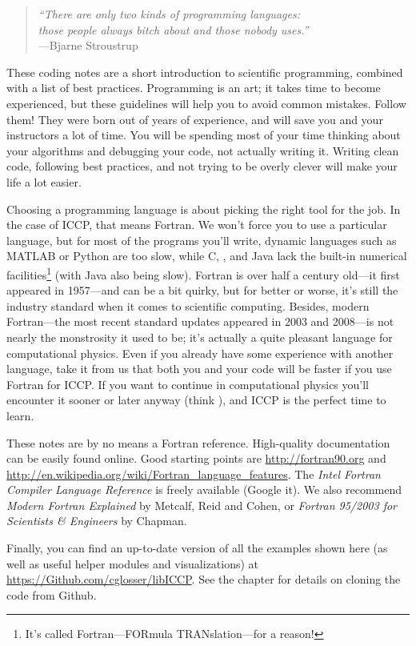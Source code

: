\label{chap:Introduction}

\begin{quote}\small
\emph{``There are only two kinds of programming languages: \\ those people always bitch about and those nobody uses.''} \\ \hspace*{\fill}---Bjarne Stroustrup
\end{quote}
These coding notes are a short introduction to scientific programming, combined with a list of best practices.
Programming is an art; it takes time to become experienced, but these guidelines will help you to avoid common mistakes.
Follow them! They were born out of years of experience, and will save you and your instructors a lot of time.
You will be spending most of your time thinking about your algorithms and debugging your code, not actually writing it.
Writing clean code, following best practices, and not trying to be overly clever will make your life a lot easier.

Choosing a programming language is about picking the right tool for the job.
In the case of ICCP, that means Fortran.
We won't force you to use a particular language, but for most of the programs you'll write, dynamic languages such as MATLAB or Python are too slow, while C, \Cplusplus, and Java lack the built-in numerical facilities\footnote{It's called Fortran---FORmula TRANslation---for a reason!} (with Java also being slow).
Fortran is over half a century old---it first appeared in 1957---and can be a bit quirky, but for better or worse, it's still the industry standard when it comes to scientific computing.
Besides, modern Fortran---the most recent standard updates appeared in 2003 and 2008---is not nearly the monstrosity it used to be; it's actually a quite pleasant language for computational physics.
Even if you already have some experience with another language, take it from us that both you and your code will be faster if you use Fortran for ICCP.
If you want to continue in computational physics you'll encounter it sooner or later anyway (think ), and ICCP is the perfect time to learn.

These notes are by no means a Fortran reference.
High-quality documentation can be easily found online.
Good starting points are \url{http://fortran90.org} and \url{http://en.wikipedia.org/wiki/Fortran_language_features}.
The \emph{Intel Fortran Compiler Language Reference} is freely available (Google it).
We also recommend \emph{Modern Fortran Explained} by Metcalf, Reid and Cohen, or \emph{Fortran 95/2003 for Scientists \& Engineers} by Chapman.

Finally, you can find an up-to-date version of all the examples shown here (as well as useful helper modules and visualizations) at \url{https://Github.com/cglosser/libICCP}.
See the  chapter for details on cloning the code from Github.
